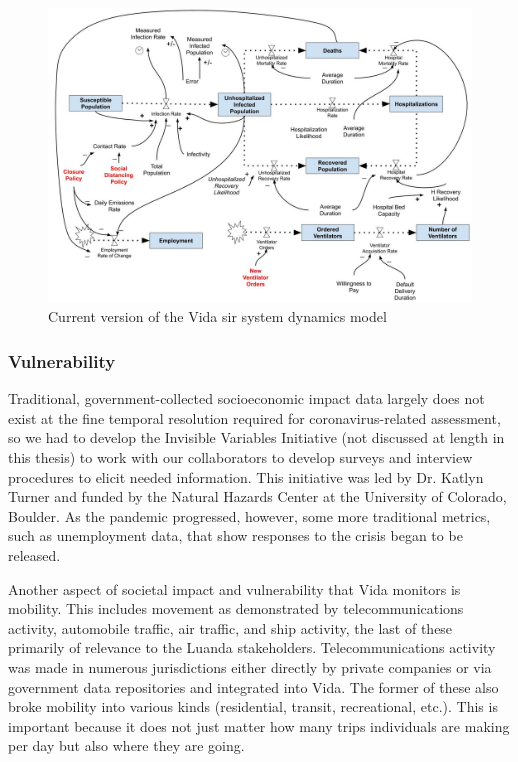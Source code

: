 \begin{figure}[!htb]
	\centering
	\includegraphics[scale=0.25]{Figures/chap5/SD_diagram.jpg}
	\caption[Current version of the Vida SIR system dynamics model]{Current version of the Vida \ac{sir} system dynamics model}
	\label{fig:vida_sd}
\end{figure}


\subsubsection{Vulnerability} \label{sec:vida-evdt-v-method}


Traditional, government-collected socioeconomic impact data largely does not exist at the fine temporal resolution required for coronavirus-related assessment, so we had to develop the Invisible Variables Initiative (not discussed at length in this thesis) to work with our collaborators to develop surveys and interview procedures to elicit needed information. This initiative was led by Dr. Katlyn Turner and funded by the Natural Hazards Center at the University of Colorado, Boulder. As the pandemic progressed, however, some more traditional metrics, such as unemployment data, that show responses to the crisis began to be released.

Another aspect of societal impact and vulnerability that Vida monitors is mobility. This includes movement as demonstrated by telecommunications activity, automobile traffic, air traffic, and ship activity, the last of these primarily of relevance to the Luanda stakeholders. Telecommunications activity was made in numerous jurisdictions either directly by private companies \cite{googleCOVID19CommunityMobility} or via government data repositories \cite{ministeriodecienciatecnologiaconocimientoeinnovacionDatosCOVID192021} and integrated into Vida. The former of these also broke mobility into various kinds (residential, transit, recreational, etc.). This is important because it does not just matter how many trips individuals are making per day but also where they are going.

